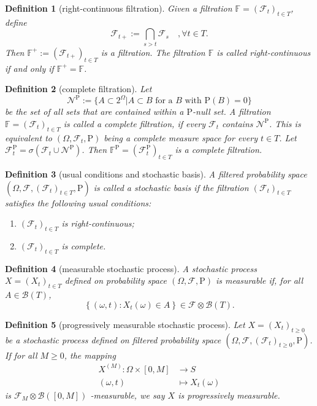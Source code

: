 \documentclass{report}
\newtheorem{definition}{Definition}[section]
\theoremstyle{nonumberplain}
\begin{document}
\begin{definition}[right-continuous filtration]
	Given a filtration $\mathbb{F}=(\mathcal{F}_{t})_{t\in T}$, define
	\[
	\mathcal{F}_{t+}:=\bigcap_{s>t}\mathcal{F}_{s}\quad,\forall t\in T.
	\]
	Then $\mathbb{F}^+:=({\mathcal{F}}_{t+})_{t\in T}$ is a filtration. The filtration $\mathbb {F}$ is called \emph{right-continuous} if and only if $\mathbb{F}^{+}=\mathbb {F}$.
\end{definition}

\begin{definition}[complete filtration]
	Let
	\[\mathcal{N}^{\mathrm{P}}:=\{A\subset 2^\Omega | A\subset B\text{ for a }B\text{ with }\mathrm{P}(B)=0\}
	\]
	be the set of all sets that are contained within a $\mathrm{P}$-null set. A filtration $\mathbb{F} =(\mathcal{F}_{t})_{t\in T}$ is called a \emph{complete filtration}, if every $\mathcal{F}_{t}$ contains $\mathcal{N}^{\mathrm{P}}$. This is equivalent to $(\Omega,\mathcal{F}_{t},\mathrm{P})$ being a complete measure space for every $t\in T$. Let $\mathcal{F}_{t}^{\mathrm{P}}=\sigma\left(\mathcal{F}_{t} \cup \mathcal{N}^{\mathrm{P}}\right)$. Then $\mathbb{F}^{\mathrm{P}} =(\mathcal{F}_{t}^{\mathrm{P}})_{t\in T}$ is a complete filtration.
\end{definition}


\begin{definition}[usual conditions and stochastic basis]
	A filtered probability space $(\Omega,\mathcal{F},(\mathcal{F}_{t})_{t\in T },\mathrm{P})$ is called a \emph{stochastic basis} if the filtration $(\mathcal{F}_{t})_{t\in T }$ satisfies the following \emph{usual conditions}:
	\begin{enumerate}
		\item $(\mathcal{F}_{t})_{t\in T }$ is right-continuous;
		\item $(\mathcal{F}_{t})_{t\in T }$ is complete.
	\end{enumerate}
\end{definition}

\begin{definition}[measurable stochastic process]
	A stochastic process $X=(X_t)_{t\in T}$ defined on probability space $(\Omega,\mathcal{F},\mathrm{P})$ is \emph{measurable} if, for all $A \in \mathcal{B}\left(T\right)$,
	\[
	\left\{( \omega,t): X_{t}(\omega) \in A\right\} \in \mathcal{F}\otimes \mathcal{B}(T) .
	\]
\end{definition}

\begin{definition}[progressively measurable stochastic process]
	Let $X=(X_t)_{t\ge0}$ be a stochastic process defined on filtered probability space $(\Omega,\mathcal{F},(\mathcal{F}_{t})_{t\ge0},\mathrm{P})$. If for all $M\ge0$, the mapping
	\begin{align*}
	X^{(M)}: \Omega \times [0, M]&\longrightarrow S\\
	(\omega,t)&\longmapsto X_t(\omega)
	\end{align*}
	is $\mathcal{F}_M\otimes \mathcal{B}([0,M])$ -measurable, we say $X$ is \emph{progressively measurable}.
\end{definition}
\end{document}

